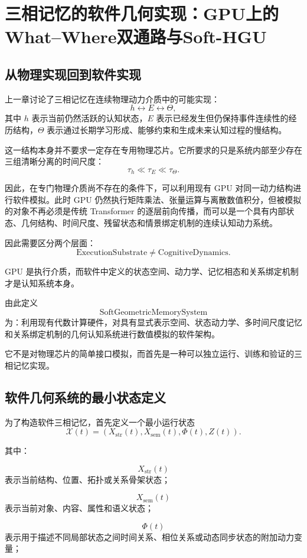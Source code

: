 \chapter{三相记忆的软件几何实现：GPU上的What--Where双通路与Soft-HGU}

\section{从物理实现回到软件实现}

上一章讨论了三相记忆在连续物理动力介质中的可能实现：
\[
h
\leftrightarrow
E
\leftrightarrow
\Theta,
\]
其中 $h$ 表示当前仍然活跃的认知状态，$E$ 表示已经发生但仍保持事件连续性的经历结构，$\Theta$ 表示通过长期学习形成、能够约束和生成未来认知过程的慢结构。

这一结构本身并不要求一定存在专用物理芯片。它所要求的只是系统内部至少存在三组清晰分离的时间尺度：
\[
\tau_h\ll\tau_E\ll\tau_\Theta.
\]

因此，在专门物理介质尚不存在的条件下，可以利用现有 GPU 对同一动力结构进行软件模拟。此时 GPU 仍然执行矩阵乘法、张量运算与离散数值积分，但被模拟的对象不再必须是传统 Transformer 的逐层前向传播，而可以是一个具有内部状态、几何结构、时间尺度、残留状态和情景绑定机制的连续认知动力系统。

因此需要区分两个层面：
\[
\boxed{
\mathrm{ExecutionSubstrate}
\neq
\mathrm{CognitiveDynamics}.
}
\]

GPU 是执行介质，而软件中定义的状态空间、动力学、记忆相态和关系绑定机制才是认知系统本身。

由此定义
\[
\boxed{
\mathrm{SoftGeometricMemorySystem}
}
\]
为：利用现有代数计算硬件，对具有显式表示空间、状态动力学、多时间尺度记忆和关系绑定机制的几何认知系统进行数值模拟的软件架构。

它不是对物理芯片的简单接口模拟，而首先是一种可以独立运行、训练和验证的三相记忆实现。

\section{软件几何系统的最小状态定义}

为了构造软件三相记忆，首先定义一个最小运行状态
\[
\mathcal{X}(t)
=
\left(
X_{\mathrm{str}}(t),
X_{\mathrm{sem}}(t),
\Phi(t),
Z(t)
\right).
\]

其中：

\[
X_{\mathrm{str}}(t)
\]
表示当前结构、位置、拓扑或关系骨架状态；

\[
X_{\mathrm{sem}}(t)
\]
表示当前对象、内容、属性和语义状态；

\[
\Phi(t)
\]
表示用于描述不同局部状态之间时间关系、相位关系或动态同步状态的附加动力变量；

